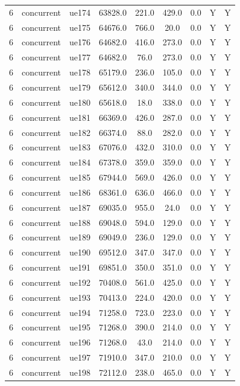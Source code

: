 \begin{table}[ht]
\begin{tabular}{|c|c|c|c|c|c|c|c|c|}
6 & concurrent & ue174 & 63828.0 & 221.0 & 429.0 & 0.0 & Y & Y \\
6 & concurrent & ue175 & 64676.0 & 766.0 & 20.0 & 0.0 & Y & Y \\
6 & concurrent & ue176 & 64682.0 & 416.0 & 273.0 & 0.0 & Y & Y \\
6 & concurrent & ue177 & 64682.0 & 76.0 & 273.0 & 0.0 & Y & Y \\
6 & concurrent & ue178 & 65179.0 & 236.0 & 105.0 & 0.0 & Y & Y \\
6 & concurrent & ue179 & 65612.0 & 340.0 & 344.0 & 0.0 & Y & Y \\
6 & concurrent & ue180 & 65618.0 & 18.0 & 338.0 & 0.0 & Y & Y \\
6 & concurrent & ue181 & 66369.0 & 426.0 & 287.0 & 0.0 & Y & Y \\
6 & concurrent & ue182 & 66374.0 & 88.0 & 282.0 & 0.0 & Y & Y \\
6 & concurrent & ue183 & 67076.0 & 432.0 & 310.0 & 0.0 & Y & Y \\
6 & concurrent & ue184 & 67378.0 & 359.0 & 359.0 & 0.0 & Y & Y \\
6 & concurrent & ue185 & 67944.0 & 569.0 & 426.0 & 0.0 & Y & Y \\
6 & concurrent & ue186 & 68361.0 & 636.0 & 466.0 & 0.0 & Y & Y \\
6 & concurrent & ue187 & 69035.0 & 955.0 & 24.0 & 0.0 & Y & Y \\
6 & concurrent & ue188 & 69048.0 & 594.0 & 129.0 & 0.0 & Y & Y \\
6 & concurrent & ue189 & 69049.0 & 236.0 & 129.0 & 0.0 & Y & Y \\
6 & concurrent & ue190 & 69512.0 & 347.0 & 347.0 & 0.0 & Y & Y \\
6 & concurrent & ue191 & 69851.0 & 350.0 & 351.0 & 0.0 & Y & Y \\
6 & concurrent & ue192 & 70408.0 & 561.0 & 425.0 & 0.0 & Y & Y \\
6 & concurrent & ue193 & 70413.0 & 224.0 & 420.0 & 0.0 & Y & Y \\
6 & concurrent & ue194 & 71258.0 & 723.0 & 223.0 & 0.0 & Y & Y \\
6 & concurrent & ue195 & 71268.0 & 390.0 & 214.0 & 0.0 & Y & Y \\
6 & concurrent & ue196 & 71268.0 & 43.0 & 214.0 & 0.0 & Y & Y \\
6 & concurrent & ue197 & 71910.0 & 347.0 & 210.0 & 0.0 & Y & Y \\
6 & concurrent & ue198 & 72112.0 & 238.0 & 465.0 & 0.0 & Y & Y \\

\end{tabular}
\end{table}
